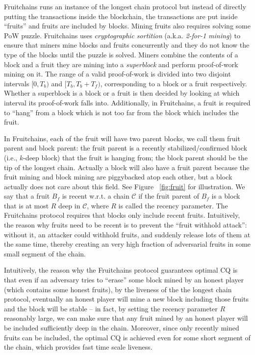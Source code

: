 \documentclass{article}
\begin{document}
\iffalse
Fruitchains runs an instance of the longest chain protocol but instead of directly putting the transactions inside the blockchain, the transactions are put inside ``fruits'' and fruits are included by blocks. Mining fruits also requires solving some PoW puzzle. Fruitchains uses \textit{cryptographic sortition} (a.k.a. {\it 2-for-1 mining}) to ensure that miners mine blocks and fruits concurrently and they do not know the type of the blocks until the puzzle is solved. Miners combine the contents of a block and a fruit they are mining into a \emph{superblock} and perform proof-of-work mining on it. The range of a valid proof-of-work is divided into two disjoint intervals $[0,T_b)$ and $[T_b, T_b + T_f)$, corresponding to a block or a fruit respectively. Whether a superblock is a block or a fruit is then decided by looking at which interval its proof-of-work falls into.
Additionally, in Fruitchains, a fruit is required to ``hang'' from a block which is not too far from the block which includes the fruit.

In Fruitchains, each of the fruit will have two parent blocks, we call them fruit parent and block parent: the fruit parent is a recently stabilized/confirmed block (i.e., $k$-deep block) that the fruit is hanging from; the block parent should be the tip of the longest chain. Actually a block will also have a fruit parent because the fruit mining and block mining are piggybacked atop each other, but a block actually does not care about this field. See Figure ~\ref{fig:fruit} for illustration. We say that a fruit $B_f$ is recent w.r.t. a chain $\mathcal{C}$ if the fruit parent of $B_f$ is a block that is at most $R$ deep in $\mathcal{C}$, where $R$ is called the recency parameter. The Fruitchains protocol requires that blocks only include recent fruits. Intuitively, the reason why fruits need to be recent is to prevent the ``fruit withhold attack'': without it, an attacker could withhold fruits, and suddenly release lots of them at the same time, thereby creating an very high fraction of adversarial fruits in some small segment of the chain.

Intuitively, the reason why the Fruitchains protocol guarantees optimal CQ is that even if an adversary tries to ``erase'' some block mined by an honest player (which contains some honest fruits), by the liveness of the the longest chain protocol, eventually an honest player will mine a new block including those fruits and the block will be stable -- in fact, by setting the recency parameter $R$ reasonably large, we can make sure that any fruit mined by an honest player will be included sufficiently deep in the chain. Moreover, since only recently mined fruits can be included, the optimal CQ is achieved even for some short segment of the chain, which provides fast time scale liveness. 
\end{document}
